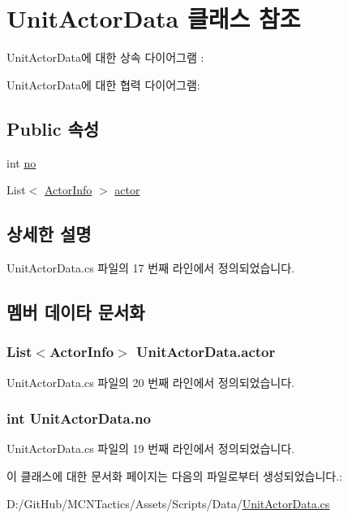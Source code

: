 \hypertarget{class_unit_actor_data}{}\section{Unit\+Actor\+Data 클래스 참조}
\label{class_unit_actor_data}


Unit\+Actor\+Data에 대한 상속 다이어그램 \+: 


Unit\+Actor\+Data에 대한 협력 다이어그램\+:
\subsection*{Public 속성}
\begin{DoxyCompactItemize}
\item 
int \hyperlink{class_unit_actor_data_a9f735b8ce20acf902658337ced801ffc}{no}
\item 
List$<$ \hyperlink{class_actor_info}{Actor\+Info} $>$ \hyperlink{class_unit_actor_data_a9208c26866ced88e2f5b6cd71ff8c36d}{actor}
\end{DoxyCompactItemize}


\subsection{상세한 설명}


Unit\+Actor\+Data.\+cs 파일의 17 번째 라인에서 정의되었습니다.



\subsection{멤버 데이타 문서화}
\subsubsection[{\texorpdfstring{actor}{actor}}]{\setlength{\rightskip}{0pt plus 5cm}List$<${\bf Actor\+Info}$>$ Unit\+Actor\+Data.\+actor}\hypertarget{class_unit_actor_data_a9208c26866ced88e2f5b6cd71ff8c36d}{}\label{class_unit_actor_data_a9208c26866ced88e2f5b6cd71ff8c36d}


Unit\+Actor\+Data.\+cs 파일의 20 번째 라인에서 정의되었습니다.

\subsubsection[{\texorpdfstring{no}{no}}]{\setlength{\rightskip}{0pt plus 5cm}int Unit\+Actor\+Data.\+no}\hypertarget{class_unit_actor_data_a9f735b8ce20acf902658337ced801ffc}{}\label{class_unit_actor_data_a9f735b8ce20acf902658337ced801ffc}


Unit\+Actor\+Data.\+cs 파일의 19 번째 라인에서 정의되었습니다.



이 클래스에 대한 문서화 페이지는 다음의 파일로부터 생성되었습니다.\+:\begin{DoxyCompactItemize}
\item 
D\+:/\+Git\+Hub/\+M\+C\+N\+Tactics/\+Assets/\+Scripts/\+Data/\hyperlink{_unit_actor_data_8cs}{Unit\+Actor\+Data.\+cs}\end{DoxyCompactItemize}
